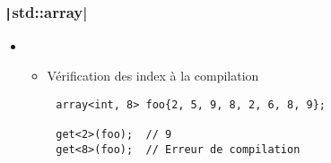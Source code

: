 \documentclass[C++.tex]{subfiles}
\begin{document}
\begin{frame}[fragile]
	\frametitle{\texttt|std::array|}
	\begin{itemize}
		\item[]\begin{itemize}
			\item Vérification des index à la compilation
		\end{itemize}
	\end{itemize}

	\begin{verbatim}
		array<int, 8> foo{2, 5, 9, 8, 2, 6, 8, 9};

		get<2>(foo);  // 9
		get<8>(foo);  // Erreur de compilation
	\end{verbatim}

\end{frame}
\end{document}
